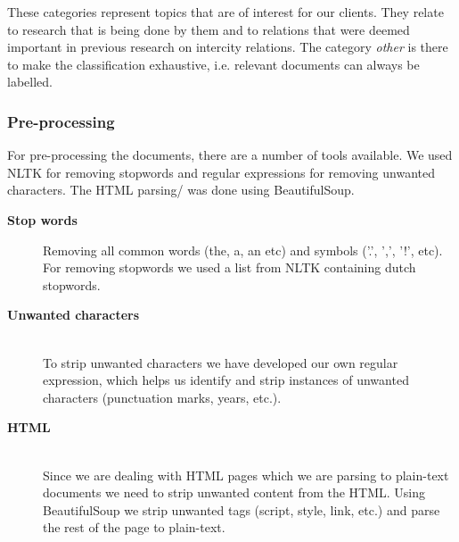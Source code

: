 These categories represent topics that are of interest for our clients. They relate to research that is being done by them and to relations that were deemed important in previous research on intercity relations. The category \textit{other} is there to make the classification exhaustive, i.e. relevant documents can always be labelled.

\subsubsection{Pre-processing}
For pre-processing the documents, there are a number of tools available. We used NLTK \cite{nlkt_stemming} for removing stopwords and regular expressions for removing unwanted characters. The HTML parsing/ was done using BeautifulSoup.

\begin{description}
\item[\textbf{Stop words}]
Removing all common words (the, a, an etc) and symbols ('.', ',', '!', etc). For removing stopwords we used a list from NLTK containing dutch stopwords.

\item[\textbf{Unwanted characters}] \\
To strip unwanted characters we have developed our own regular expression, which helps us identify and strip instances of unwanted characters (punctuation marks, years, etc.). 

\item[\textbf{HTML}] \\
Since we are dealing with HTML pages which we are parsing to plain-text documents we need to strip unwanted content from the HTML. Using BeautifulSoup we strip unwanted tags (script, style, link, etc.) and parse the rest of the page to plain-text.
\end{description}

